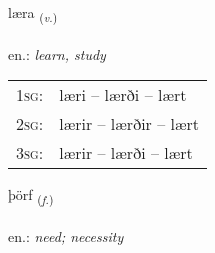 \documentclass[frontgrid, backgrid]{flacards}\usepackage[]{graphicx}\usepackage[]{xcolor}
\begin{document}
\renewcommand{\blhead}{\vskip5pt {\small\bfseries\footnotesize Sagnorð | Verb }}
\renewcommand{\bcfoot}{\vskip5pt \hspace{2pt}{\small\bfseries\footnotesize 1K}}


{læra \small{\textsubscript{(\textit{v.})}} \\[1ex] %
\textphonetic{[laiːra]} \\
en.: \emph{learn, study} \\  [2ex]
\renewcommand*{\arraystretch}{0.8}
\begin{tabular}{p{1cm}l}
\textsc{1sg}: & læri -- lærði -- lært \\ 
\textsc{2sg}: & lærir -- lærðir -- lært \\ 
\textsc{3sg}: & lærir -- lærði -- lært \\ 
\end{tabular}
}

\renewcommand{\flhead}{\vskip5pt \fboxsep=0pt {\small\bfseries\footnotesize Nafnorð | Noun}}
\renewcommand{\fcfoot}{\vskip5pt \fboxsep=0pt \hspace{2pt}{\small\bfseries\footnotesize 1K}}

\renewcommand{\blhead}{\vskip5pt {\small\bfseries\footnotesize Nafnorð | Noun }}
\renewcommand{\bcfoot}{\vskip5pt \hspace{2pt}{\small\bfseries\footnotesize 1K}}


{þörf \small{\textsubscript{(\textit{f.})}} \\[1ex] %
\textphonetic{[θœrv]} \\
en.: \emph{need; necessity} \\  [2ex]
\renewcommand*{\arraystretch}{0.8}
}

\renewcommand{\flhead}{\vskip5pt \fboxsep=0pt {\small\bfseries\footnotesize Sagnorð | Verb}}
\renewcommand{\fcfoot}{\vskip5pt \fboxsep=0pt \hspace{2pt}{\small\bfseries\footnotesize 1K}}
\end{document}
